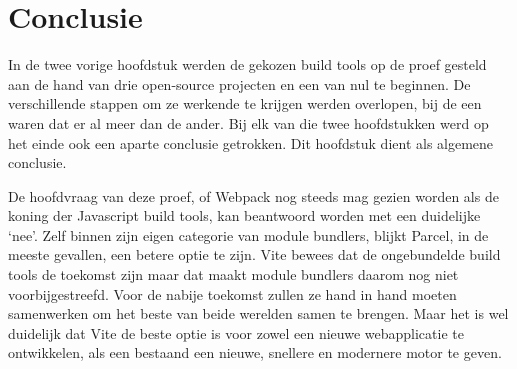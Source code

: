 \chapter{Conclusie}
\label{ch:conclusie}

In de twee vorige hoofdstuk werden de gekozen build tools op de proef gesteld aan de hand van drie open-source projecten en een van nul te beginnen. De verschillende stappen om ze werkende te krijgen werden overlopen, bij de een waren dat er al meer dan de ander. Bij elk van die twee hoofdstukken werd op het einde ook een aparte conclusie getrokken. Dit hoofdstuk dient als algemene conclusie. 

De hoofdvraag van deze proef, of Webpack nog steeds mag gezien worden als de koning der Javascript build tools, kan beantwoord worden met een duidelijke ‘nee’. Zelf binnen zijn eigen categorie van module bundlers, blijkt Parcel, in de meeste gevallen, een betere optie te zijn. Vite bewees dat de ongebundelde build tools de toekomst zijn maar dat maakt module bundlers daarom nog niet voorbijgestreefd. Voor de nabije toekomst zullen ze hand in hand moeten samenwerken om het beste van beide werelden samen te brengen. Maar het is wel duidelijk dat Vite de beste optie is voor zowel een nieuwe webapplicatie te ontwikkelen, als een bestaand een nieuwe, snellere en modernere motor te geven.

